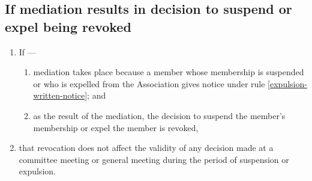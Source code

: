 \documentclass[../constitution.tex]{subfiles}
\begin{document}
\hypertarget{if-mediation-results-in-decision-to-suspend-or-expel-being-revoked}{%
\subsection{If mediation results in decision to suspend or expel being revoked}\label{if-mediation-results-in-decision-to-suspend-or-expel-being-revoked}}

\begin{enumerate}

\item If ---

  \begin{enumerate}
  
  \item mediation takes place because a member whose membership is suspended or who is expelled from the Association gives notice under rule \ref{expulsion-written-notice}; and
  \item as the result of the mediation, the decision to suspend the member's membership or expel the member is revoked,
  \end{enumerate}
\item that revocation does not affect the validity of any decision made at a committee meeting or general meeting during the period of suspension or expulsion.
\end{enumerate}
\end{document}

